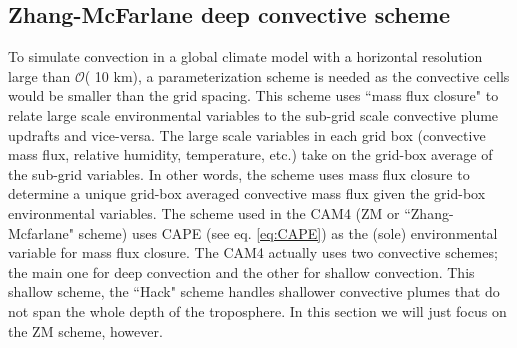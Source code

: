 \documentclass[letterpaper,12pt,titlepage,oneside,final]{book}
\begin{document}
\subsection{Zhang-McFarlane deep convective scheme}\label{ZM}
To simulate convection in a global climate model with a horizontal resolution large than $\mathcal{O}$( 10 km), a parameterization scheme is needed as the convective cells would be smaller than the grid spacing. This scheme uses ``mass flux closure" to relate large scale environmental variables to the sub-grid scale convective plume updrafts and vice-versa. The large scale variables in each grid box (convective mass flux, relative humidity, temperature, etc.) take on the grid-box average of the sub-grid variables. In other words, the scheme uses mass flux closure to determine a unique grid-box averaged convective mass flux given the grid-box environmental variables. The scheme used in the CAM4 (ZM or ``Zhang-Mcfarlane" scheme) \citep{zhang_sensitivity_1995} uses CAPE (see eq. \ref{eq:CAPE}) as the (sole) environmental variable for mass flux closure. The CAM4 actually uses two convective schemes; the main one for deep convection and the other for shallow convection. This shallow scheme, the ``Hack" scheme \citep{hack_parameterization_1994} handles shallower convective plumes that do not span the whole depth of the troposphere. In this section we will just focus on the ZM scheme, however.
\end{document}
